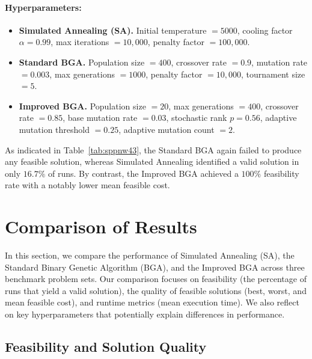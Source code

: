 \documentclass[12pt]{article}
\begin{document}
\paragraph{Hyperparameters:}
\vspace{-1.5em}
\begin{itemize}
    \item \textbf{Simulated Annealing (SA).}
    Initial temperature $= 5000$, 
    cooling factor $\alpha = 0.99$, 
    max iterations $= 10{,}000$, 
    penalty factor $= 100{,}000$. 
    
    \item \textbf{Standard BGA.}
    Population size $= 400$, 
    crossover rate $= 0.9$, 
    mutation rate $= 0.003$, 
    max generations $= 1000$, 
    penalty factor $= 10{,}000$, 
    tournament size $= 5$. 
    
    \item \textbf{Improved BGA.}
    Population size $= 20$, 
    max generations $= 400$, 
    crossover rate $= 0.85$, 
    base mutation rate $= 0.03$, 
    stochastic rank $p = 0.56$, 
    adaptive mutation threshold $= 0.25$, 
    adaptive mutation count $= 2$.
\end{itemize}

\noindent
As indicated in Table~\ref{tab:sppnw43}, the Standard BGA again failed to produce any feasible solution, whereas Simulated Annealing identified a valid solution in only $16.7\%$ of runs. By contrast, the Improved BGA achieved a $100\%$ feasibility rate with a notably lower mean feasible cost.

\section{Comparison of Results}
\label{sec:comparison}

In this section, we compare the performance of Simulated Annealing (SA), the Standard Binary Genetic Algorithm (BGA), and the Improved BGA across three benchmark problem sets. Our comparison focuses on feasibility (the percentage of runs that yield a valid solution), the quality of feasible solutions (best, worst, and mean feasible cost), and runtime metrics (mean execution time). We also reflect on key hyperparameters that potentially explain differences in performance.

\subsection{Feasibility and Solution Quality}
\end{document}
